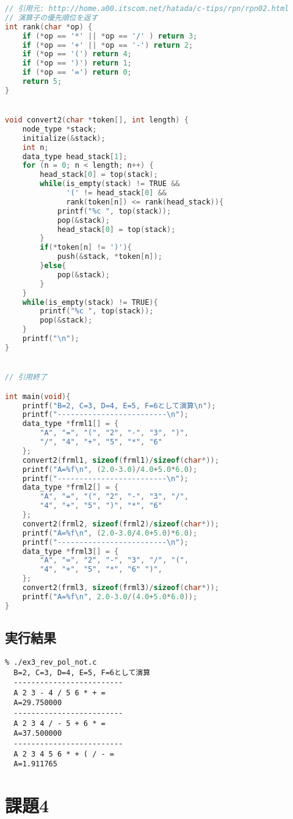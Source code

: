 \documentclass[11pt,a4paper, uplatex]{jsarticle}
\begin{document}
\begin{lstlisting}[language=c]
// 引用元: http://home.a00.itscom.net/hatada/c-tips/rpn/rpn02.html
// 演算子の優先順位を返す
int rank(char *op) {
    if (*op == '*' || *op == '/' ) return 3;
    if (*op == '+' || *op == '-') return 2;
    if (*op == '(') return 4;
    if (*op == ')') return 1;
    if (*op == '=') return 0;
    return 5;
}


void convert2(char *token[], int length) {
    node_type *stack;
    initialize(&stack);
    int n;
    data_type head_stack[1];
    for (n = 0; n < length; n++) {
        head_stack[0] = top(stack);
        while(is_empty(stack) != TRUE &&
              '(' != head_stack[0] &&
              rank(token[n]) <= rank(head_stack)){
            printf("%c ", top(stack));
            pop(&stack);
            head_stack[0] = top(stack);
        }
        if(*token[n] != ')'){
            push(&stack, *token[n]);
        }else{
            pop(&stack);
        }
    }
    while(is_empty(stack) != TRUE){
        printf("%c ", top(stack));
        pop(&stack);
    }
    printf("\n");
}


// 引用終了

int main(void){
    printf("B=2, C=3, D=4, E=5, F=6として演算\n");
    printf("-------------------------\n");
    data_type *frml1[] = {
        "A", "=", "(", "2", "-", "3", ")",
        "/", "4", "+", "5", "*", "6"
    };
    convert2(frml1, sizeof(frml1)/sizeof(char*));
    printf("A=%f\n", (2.0-3.0)/4.0+5.0*6.0);
    printf("-------------------------\n");
    data_type *frml2[] = {
        "A", "=", "(", "2", "-", "3", "/",
        "4", "+", "5", ")", "*", "6"
    };
    convert2(frml2, sizeof(frml2)/sizeof(char*));
    printf("A=%f\n", (2.0-3.0/4.0+5.0)*6.0);
    printf("-------------------------\n");
    data_type *frml3[] = {
        "A", "=", "2", "-", "3", "/", "(",
        "4", "+", "5", "*", "6" ")",
    };
    convert2(frml3, sizeof(frml3)/sizeof(char*));
    printf("A=%f\n", 2.0-3.0/(4.0+5.0*6.0));
}
\end{lstlisting}
\subsection{実行結果}
\begin{lstlisting}
% ./ex3_rev_pol_not.c
  B=2, C=3, D=4, E=5, F=6として演算
  -------------------------
  A 2 3 - 4 / 5 6 * + =
  A=29.750000
  -------------------------
  A 2 3 4 / - 5 + 6 * =
  A=37.500000
  -------------------------
  A 2 3 4 5 6 * + ( / - =
  A=1.911765
\end{lstlisting}
\section{課題4}
\end{document}
